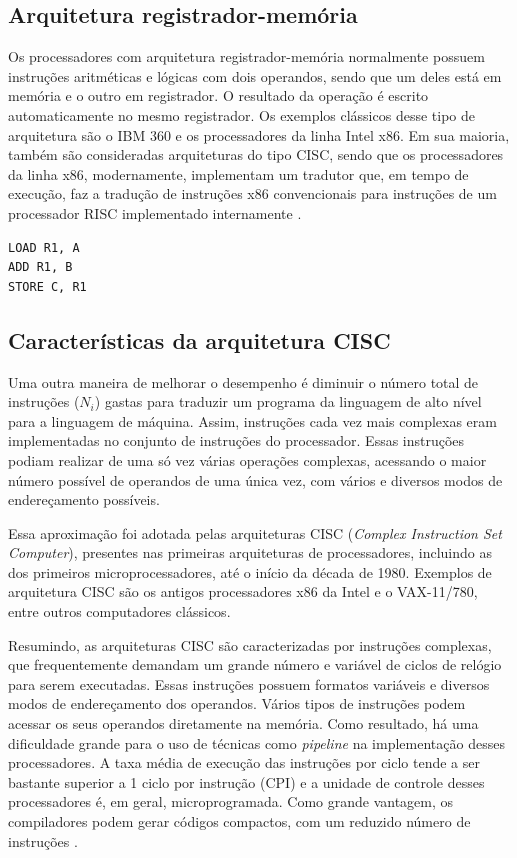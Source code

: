 \subsection{Arquitetura registrador-memória}
Os processadores com arquitetura registrador-memória normalmente possuem instruções aritméticas e lógicas com dois operandos, sendo que um deles está em memória e o outro em registrador. O resultado da operação é escrito automaticamente no mesmo registrador. Os exemplos clássicos desse tipo de arquitetura são o IBM 360 e os processadores da linha Intel x86. Em sua maioria, também são consideradas arquiteturas do tipo CISC, sendo que os processadores da linha x86, modernamente, implementam um tradutor que, em tempo de execução, faz a tradução de instruções x86 convencionais para instruções de um processador RISC implementado internamente \cite{silva2024}.

\begin{lstlisting}[caption={Exemplo de sequência em arquitetura registrador-memória (soma de A e B armazenada em C)}, label={lst:pseudo}]
LOAD R1, A
ADD R1, B
STORE C, R1
\end{lstlisting}

\subsection{Características da arquitetura CISC}
Uma outra maneira de melhorar o desempenho é diminuir o número total de instruções ($N_i$) gastas para traduzir um programa da linguagem de alto nível para a linguagem de máquina. Assim, instruções cada vez mais complexas eram implementadas no conjunto de instruções do processador. Essas instruções podiam realizar de uma só vez várias operações complexas, acessando o maior número possível de operandos de uma única vez, com vários e diversos modos de endereçamento possíveis.

Essa aproximação foi adotada pelas arquiteturas CISC (\textit{Complex Instruction Set Computer}), presentes nas primeiras arquiteturas de processadores, incluindo as dos primeiros microprocessadores, até o início da década de 1980. Exemplos de arquitetura CISC são os antigos processadores x86 da Intel e o VAX-11/780, entre outros computadores clássicos.

Resumindo, as arquiteturas CISC são caracterizadas por instruções complexas, que frequentemente demandam um grande número e variável de ciclos de relógio para serem executadas. Essas instruções possuem formatos variáveis e diversos modos de endereçamento dos operandos. Vários tipos de instruções podem acessar os seus operandos diretamente na memória. Como resultado, há uma dificuldade grande para o uso de técnicas como \textit{pipeline} na implementação desses processadores. A taxa média de execução das instruções por ciclo tende a ser bastante superior a 1 ciclo por instrução (CPI) e a unidade de controle desses processadores é, em geral, microprogramada. Como grande vantagem, os compiladores podem gerar códigos compactos, com um reduzido número de instruções \cite{silva2024}.

